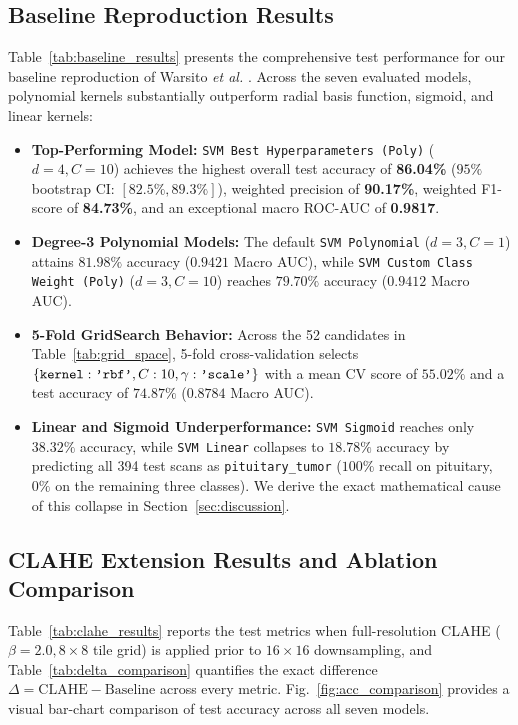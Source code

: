 \documentclass[conference]{IEEEtran}
\begin{document}
\subsection{Baseline Reproduction Results}
Table~\ref{tab:baseline_results} presents the comprehensive test performance for our baseline reproduction of Warsito \emph{et al.} \cite{warsito2026lightweight}. Across the seven evaluated models, polynomial kernels substantially outperform radial basis function, sigmoid, and linear kernels:
\begin{itemize}
    \item \textbf{Top-Performing Model:} \texttt{SVM Best Hyperparameters (Poly)} ($d=4, C=10$) achieves the highest overall test accuracy of \textbf{86.04\%} ($95\%$ bootstrap CI: $[82.5\%, 89.3\%]$), weighted precision of \textbf{90.17\%}, weighted F1-score of \textbf{84.73\%}, and an exceptional macro ROC-AUC of \textbf{0.9817}.
    \item \textbf{Degree-3 Polynomial Models:} The default \texttt{SVM Polynomial} ($d=3, C=1$) attains $81.98\%$ accuracy ($0.9421$ Macro AUC), while \texttt{SVM Custom Class Weight (Poly)} ($d=3, C=10$) reaches $79.70\%$ accuracy ($0.9412$ Macro AUC).
    \item \textbf{5-Fold GridSearch Behavior:} Across the 52 candidates in Table~\ref{tab:grid_space}, 5-fold cross-validation selects $\{\text{\texttt{kernel}}: \text{\texttt{'rbf'}}, C: 10, \gamma: \text{\texttt{'scale'}}\}$ with a mean CV score of $55.02\%$ and a test accuracy of $74.87\%$ ($0.8784$ Macro AUC).
    \item \textbf{Linear and Sigmoid Underperformance:} \texttt{SVM Sigmoid} reaches only $38.32\%$ accuracy, while \texttt{SVM Linear} collapses to $18.78\%$ accuracy by predicting all 394 test scans as \texttt{pituitary\_tumor} ($100\%$ recall on pituitary, $0\%$ on the remaining three classes). We derive the exact mathematical cause of this collapse in Section~\ref{sec:discussion}.
\end{itemize}

\subsection{CLAHE Extension Results and Ablation Comparison}
Table~\ref{tab:clahe_results} reports the test metrics when full-resolution CLAHE ($\beta=2.0, 8 \times 8$ tile grid) is applied prior to $16 \times 16$ downsampling, and Table~\ref{tab:delta_comparison} quantifies the exact difference $\Delta = \text{CLAHE} - \text{Baseline}$ across every metric. Fig.~\ref{fig:acc_comparison} provides a visual bar-chart comparison of test accuracy across all seven models.
\end{document}
